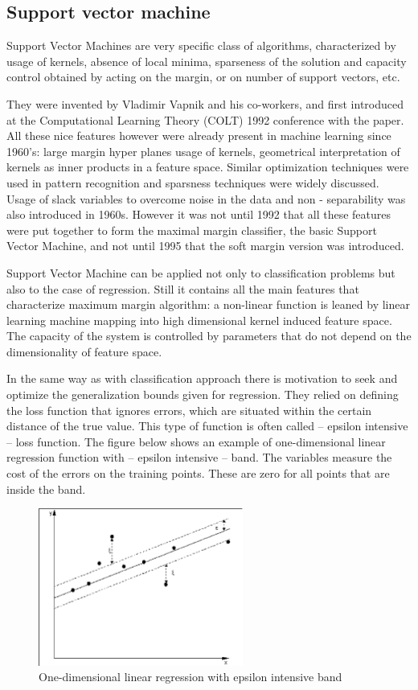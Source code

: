 \subsection{Support vector machine}
\FloatBarrier
Support Vector Machines are very specific class of algorithms, 
characterized by usage of kernels, absence of local minima, sparseness of the solution and 
capacity control obtained by acting on the margin, or on number of support vectors, etc.

They were invented by Vladimir Vapnik and his co-workers, 
and first introduced at the Computational Learning Theory (COLT) 1992 conference with the paper.
All these nice features however were already present in machine learning since 1960’s: 
large margin hyper planes usage of kernels, geometrical interpretation of kernels as inner
products in a feature space.
Similar optimization techniques were used in pattern recognition and sparsness techniques 
were widely discussed.
Usage of slack variables to overcome noise in the data and non - separability was also
introduced in 1960s.
However it was not until 1992 that all these features were put together to form the
maximal margin classifier, the basic Support Vector Machine, and not until 1995 that the
soft margin version was introduced.

Support Vector Machine can be applied not only to classification problems but also to the
case of regression.
Still it contains all the main features that characterize maximum margin algorithm:
a non-linear function is leaned by linear learning machine mapping into high dimensional kernel
induced feature space.
The capacity of the system is controlled by parameters that do not depend on the dimensionality
of feature space.

In the same way as with classification approach there is motivation to seek and optimize the
generalization bounds given for regression.
They relied on defining the loss function that ignores errors, which are situated within
the certain distance of the true value.
This type of function is often called – epsilon intensive – loss function. 
The figure below shows an example of one-dimensional linear regression function with – 
epsilon intensive – band. The variables measure the cost of the errors on the training points.
These are zero for all points that are inside the band. 
\begin{figure}[htb] 
	\label{fig:svm1}
	\centering
	\includegraphics[width=0.6\textwidth]{figures/svm1}
	\caption{One-dimensional linear regression with epsilon intensive band}
\end{figure}

